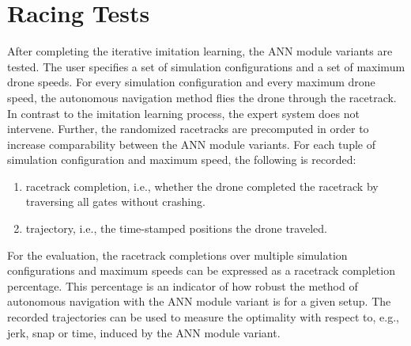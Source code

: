 \section{Racing Tests}
After completing the iterative imitation learning,
the ANN module variants are tested.
The user specifies a set of 
simulation configurations and
a set of maximum drone speeds.
For every simulation configuration
and every maximum drone speed,
the autonomous navigation method flies the drone through the racetrack.
In contrast to the imitation learning process,
the expert system does not intervene.
Further, the randomized racetracks are precomputed
in order to increase comparability
between the ANN module variants.
For each tuple of simulation configuration and maximum speed,
the following is recorded:
\begin{enumerate}
    \item racetrack completion, i.e., 
    whether the drone completed the racetrack by traversing all gates without crashing.
    \item trajectory, i.e., the time-stamped positions the drone traveled.
\end{enumerate}
For the evaluation, 
the racetrack completions over multiple simulation configurations
and maximum speeds can be expressed as a racetrack completion percentage.
This percentage 
is an indicator 
of how robust the method of autonomous navigation 
with the ANN module variant is for a given setup.
The recorded trajectories can be used to measure the 
optimality
with respect to, e.g., jerk, snap or time,
induced by the ANN module variant.




